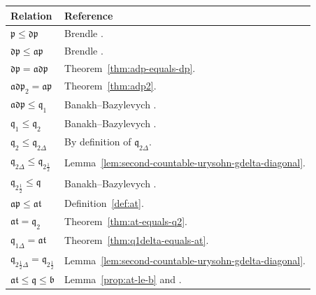 \begin{center}
\begin{tabular}{@{}ll@{}}
\toprule
\textbf{Relation} & \textbf{Reference} \\
\midrule

$\mathfrak p\leq\mathfrak{dp}$ 
& Brendle \cite{brendle1999dow}. \\

$\mathfrak{dp}\leq\mathfrak{ap}$ 
& Brendle \cite{brendle1999dow}. \\

$\mathfrak{dp}=\mathfrak{adp}$ 
& Theorem~\ref{thm:adp-equals-dp}. \\

$\mathfrak{adp}_2=\mathfrak{ap}$ 
& Theorem~\ref{thm:adp2}. \\

$\mathfrak{adp}\leq\mathfrak q_1$ 
& Banakh--Bazylevych \cite{banakh2023q}. \\

$\mathfrak q_1\leq\mathfrak q_2$
& Banakh--Bazylevych \cite{banakh2023q}. \\

$\mathfrak q_2\leq\mathfrak q_{2\Delta}$ 
& By definition of $\mathfrak q_{2\Delta}$. \\

$\mathfrak q_{2\Delta}\leq\mathfrak q_{2\frac{1}{2}}$ 
& Lemma~\ref{lem:second-countable-urysohn-gdelta-diagonal}. \\

$\mathfrak q_{2\frac{1}{2}}\leq \mathfrak q$ 
& Banakh--Bazylevych \cite{banakh2023q}. \\

$\mathfrak{ap}\leq\mathfrak{at}$ 
& Definition~\ref{def:at}. \\

$\mathfrak{at}=\mathfrak q_2$
& Theorem~\ref{thm:at-equals-q2}. \\

$\mathfrak q_{1\Delta}=\mathfrak{at}$
& Theorem~\ref{thm:q1delta-equals-at}. \\

$\mathfrak q_{2\frac{1}{2}\Delta}=\mathfrak q_{2\frac{1}{2}}$
& Lemma~\ref{lem:second-countable-urysohn-gdelta-diagonal}. \\

$\mathfrak{at}\leq\mathfrak q\leq\mathfrak b$
& Lemma~\ref{prop:at-le-b} and \cite{miller1984special}. \\

\bottomrule
\end{tabular}
\end{center}

